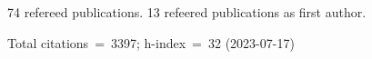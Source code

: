 74 refereed publications. 13 refeered publications as first author.

Total citations~=~3397; h-index~=~32 (2023-07-17)